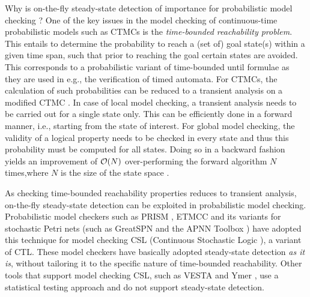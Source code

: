 \documentclass[times, 10pt,twocolumn]{article}
\begin{document}
Why is on-the-fly steady-state detection of importance for probabilistic model checking \cite{Kwiatkowska_SLCS03}?
One of the key issues in the model checking of continuous-time probabilistic models such as 
CTMCs is the \emph{time-bounded reachability problem}. 
This entails to determine the probability to reach a (set of) goal state(s) within a given time span, 
such that prior to reaching the goal certain states are avoided. 
This corresponds to a probabilistic variant of time-bounded until formulae as they are used in 
e.g., the verification of timed automata.
For CTMCs, the calculation of such probabilities can be reduced to a transient analysis on a 
modified CTMC \cite{BaierHHK_TSE03}. 
In case of local model checking, a transient analysis needs to be carried out for a single state 
only.
This can be efficiently done in a forward manner, i.e., starting from the state of interest. 
For global model checking, the validity of a logical property needs to be checked in every state 
and thus this probability must be computed for all states. 
Doing so in a backward fashion yields an improvement of ${\cal O}(N)$ over-performing the forward algorithm $N$ times,where $N$ is the size of the state space \cite{KatoenKNP_LNCS01}.

As checking time-bounded reachability properties reduces to transient analysis, on-the-fly steady-state detection can be exploited in probabilistic model checking.
Probabilistic model checkers such as PRISM \cite{KwiatkowskaNP_QEST04}, ETMCC \cite{HermansKMS_IJSTTT03} and its variants for stochastic
Petri nets (such as GreatSPN \cite{DAprileDS_DS04} and the APNN Toolbox \cite{BuchholzFKT_MMECCS03}) have adopted this technique
for model checking CSL (Continuous Stochastic Logic \cite{AzizSSB_ACMTCL00,BaierHHK_TSE03}), a variant of CTL.
These model checkers have basically adopted steady-state detection \emph{as it is}, without 
tailoring it to the specific nature of time-bounded reachability.
Other tools that support model checking CSL, such as VESTA \cite{SenVA_CAV05} and Ymer \cite{Younes_CAV05}, use a statistical testing approach and do not support steady-state detection. 
\end{document}
